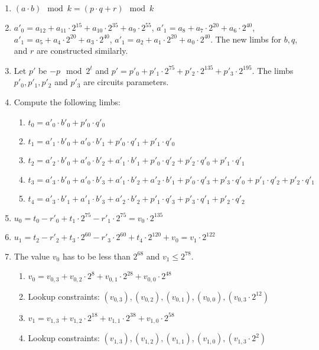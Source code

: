 \begin{enumerate}
\item $(a\cdot b) \mod k = (p \cdot q + r) \mod k$
\item $a'_0 = a_{12} + a_{11} \cdot 2^{15} + a_{10} \cdot 2^{35} + a_9 \cdot 2^{55}$, $a'_1 = a_8 + a_7 \cdot 2^{20} + a_6 \cdot 2^{40}$, $a'_1 = a_5 + a_4 \cdot 2^{20} + a_3 \cdot 2^{40}$, $a'_1 = a_2 + a_1 \cdot 2^{20} + a_0 \cdot 2^{40}$.
The new limbs for  $b, q$, and $r$ are constructed similarly.
\item Let $p'$ be $-p \mod 2^t$ and $p' = p'_{0} + p'_{1}\cdot 2^{75} + p'_2 \cdot 2^{135}+ p'_3 \cdot 2^{195}$. The limbs $p'_0, p'_1, p'_2$ and $p'_3$ are circuits parameters.
\item Compute the following limbs:
	\begin{enumerate}
	\item $t_0 = a'_0 \cdot b'_0 + p'_0 \cdot q'_0$
	\item $t_1 = a'_1 \cdot b'_0 + a'_0 \cdot b'_1 + p'_0 \cdot q'_1 + p'_1 \cdot q'_0$
	\item $t_2 = a'_2 \cdot b'_0 + a'_0 \cdot b'_2 + a'_1 \cdot b'_1 + p'_0 \cdot q'_2 + p'_2 \cdot q'_0+ p'_1 		\cdot q'_1$
	\item $t_3 = a'_3 \cdot b'_0 + a'_0 \cdot b'_3 + a'_1 \cdot b'_2 + a'_2 \cdot b'_1 + p'_0 \cdot q'_3 + p'_3 	\cdot q'_0+ p'_1 \cdot q'_2 + p'_2 \cdot q'_1$
	\item $t_4 = a'_3 \cdot b'_1 + a'_1 \cdot b'_3 + a'_2 \cdot b'_2 + p'_1 \cdot q'_3 + p'_3 \cdot q'_1+ p'_2 			\cdot q'_2$
	\end{enumerate}
\item $u_0 = t_0 - r'_0 + t_1 \cdot 2^{75} - r'_1 \cdot 2^{75} = v_0 \cdot 2^{135}$
\item $u_1 = t_2 - r'_2 + t_3 \cdot 2^{60} - r'_3 \cdot 2^{60} + t_4 \cdot 2^{120} + v_0 = v_1 \cdot 2^{122}$
\item The value $v_0$ has to be less than $2^{68}$ and $v_1 \le 2^{78}$.
\begin{enumerate}
	\item $v_0 = v_{0,3} + v_{0,2} \cdot 2^{8} + v_{0,1} \cdot 2^{28} + v_{0,0} \cdot 2^{48}$
	\item Lookup constraints: $(v_{0,3}), (v_{0,2}), (v_{0,1}), (v_{0,0}), (v_{0,3} \cdot 2^{12})$
	\item $v_1 = v_{1,3} + v_{1,2} \cdot 2^{18} + v_{1,1} \cdot 2^{38} + v_{1,0} \cdot 2^{58}$
	\item Lookup constraints: $(v_{1,3}), (v_{1,2}), (v_{1,1}), (v_{1,0}), (v_{1,3} \cdot 2^{2})$
\end{enumerate}
\end{enumerate}

